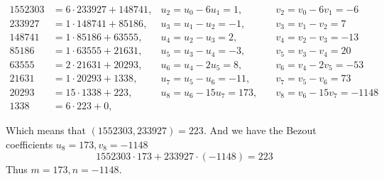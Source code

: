 \documentclass{article}
\begin{document}
\begin{align*}
   1552303 &= 6 \cdot 233927 + 148741, & u_2 = u_0 - 6u_1 = 1, \quad & v_2 = v_0 - 6v_1 = -6 \\
   233927 &= 1 \cdot 148741 + 85186, & u_3 = u_1 - u_2 = -1, \quad & v_3 = v_1 - v_2 = 7 \\
   148741 &= 1 \cdot 85186 + 63555, & u_4 = u_2 - u_3 = 2, \quad & v_4 = v_2 - v_3 = -13 \\
   85186 &= 1 \cdot 63555 + 21631, & u_5 = u_3 - u_4 = -3, \quad & v_5 = v_3 - v_4 = 20 \\
   63555 &= 2 \cdot 21631 + 20293, & u_6 = u_4 - 2u_5 = 8, \quad & v_6 = v_4 - 2v_5 = -53 \\
   21631 &= 1 \cdot 20293 + 1338, & u_7 = u_5 - u_6 = -11, \quad & v_7 = v_5 - v_6 = 73 \\
   20293 &= 15 \cdot 1338 + 223, & u_8 = u_6 - 15u_7 = 173, \quad & v_8 = v_6 - 15v_7 = -1148 \\
   1338 &= 6 \cdot 223 + 0, & &
\end{align*}

Which means that \((1552303, 233927) = 223\). And we have the Bezout coefficients \(u_8 = 173, v_8 = -1148\)
\[
   1552303 \cdot 173 + 233927 \cdot (-1148) = 223
\]
Thus \(m = 173, n = -1148\).
\end{document}
